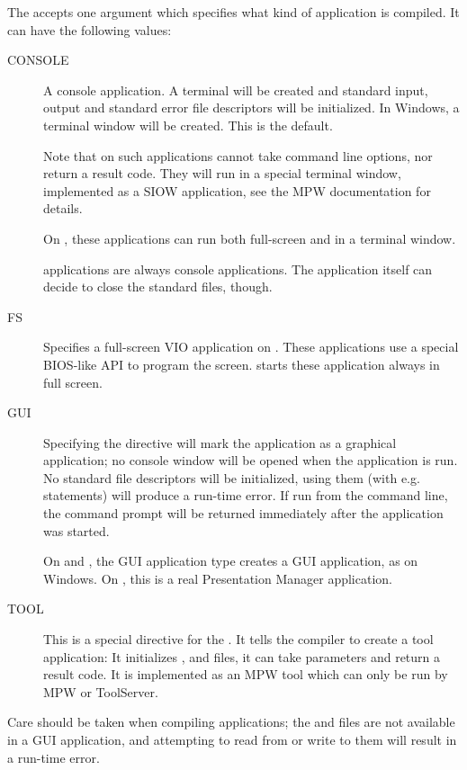 The  accepts one argument which specifies what kind
of application is compiled. It can have the following
values:
\begin{description}
\item[CONSOLE] A console application. A terminal will be created and
standard input, output and standard error file descriptors will be
initialized. In Windows, a terminal window will be created. This is the
default. 

Note that on \macos such applications cannot take command line
options, nor return a result code. They will run in a special 
terminal window, implemented as a SIOW application, see the MPW 
documentation for details.

On \ostwo, these applications can run both full-screen and in a terminal
window.

\linux applications are always console applications. The application itself
can decide to close the standard files, though.

\item[FS] Specifies a full-screen VIO application on \ostwo. These
applications use a special BIOS-like API to program the screen. \ostwo
starts these application always in full screen.

\item[GUI] Specifying the  directive will mark the 
application as a graphical application; no console window will be opened 
when the application is run. No standard file descriptors will be
initialized, using them (with e.g.  statements) will produce  a
run-time error. If run from the command line, the command prompt will be
returned immediately after the application was started.

On \ostwo and \macos, the GUI application type creates a GUI application, as
on Windows. On \ostwo, this is a real Presentation Manager application.

\item[TOOL] This is a special directive for the \macos. It tells the compiler
to create a tool application: It initializes ,  and
 files, it can take parameters and return a result code. It is implemented as an MPW
tool which can only be run by MPW or ToolServer.
\end{description} 
Care should be taken when compiling  applications; the 
and  files are not available in a GUI application, and
attempting to read from or write to them will result in a run-time error.

